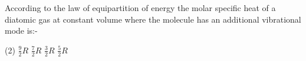 \item According to the law of equipartition of energy the molar specific heat of a diatomic gas at constant volume where the molecule has an additional vibrational mode is:-
    \begin{tasks}(2)
        \task $\frac{9}{2}R$
        \task $\frac{7}{2}R$
        \task $\frac{3}{2}R$
        \task $\frac{5}{2}R$
    \end{tasks}